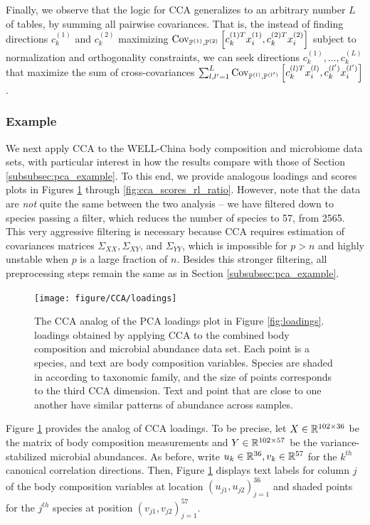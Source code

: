\documentclass[14pt]{extarticle}
\begin{document}
Finally, we observe that the logic for CCA generalizes to an arbitrary number
$L$ of tables, by summing all pairwise covariances. That is, the instead of
finding directions $c_{k}^{(1)}$ and $c_{k}^{(2)}$ maximizing
$\mathrm{Cov}_{\mathbb{P}^{(1)}, \mathbb{P}^{(2)}}\left[{c_{k}^{(1)T}x_{i}^{(1)},
  c_{k}^{(2)T}x_{i}^{(2)}}\right]$ subject to normalization and orthogonality
constraints, we can seek directions $c_{k}^{(1)}, \dots, c_{k}^{(L)}$ that
maximize the sum of cross-covariances $\sum_{l,l^{\prime} = 1}^{L}
\mathrm{Cov}_{\mathbb{P}^{(l)}, \mathbb{P}^{(l^{\prime})}}\left[{c_{k}^{(l) T}x_{i}^{(l)},
  c_{k}^{(l^{\prime})}x_{i}^{(l^{\prime})}}\right]$.

\subsubsection{Example}
\label{subsubsec:cca_example}

We next apply CCA to the WELL-China body composition and microbiome data sets,
with particular interest in how the results compare with those of Section
\ref{subsubsec:pca_example}. To this end, we provide analogous loadings and
scores plots in Figures \ref{fig:cca_loadings} through
\ref{fig:cca_scores_rl_ratio}. However, note that the data are \textit{not}
quite the same between the two analysis -- we have filtered down to species passing
a filter, which reduces the number of species to 57, from 2565. This very
aggressive filtering is necessary because CCA requires estimation of covariances
matrices $\Sigma_{XX}, \Sigma_{XY}$, and $\Sigma_{YY}$, which is impossible for
$p > n$ and highly unstable when $p$ is a large fraction of $n$. Besides this
stronger filtering, all preprocessing steps remain the same as in Section
\ref{subsubsec:pca_example}.

\begin{figure}
  \centering
  \texttt{[image: figure/CCA/loadings]}
  \caption{The CCA analog of the PCA loadings plot in Figure \ref{fig:loadings}.
      loadings obtained by applying CCA to the combined body
      composition and microbial abundance data set. Each point is a species, and
      text are body composition variables. Species are shaded in according to
      taxonomic family, and the size of points corresponds to the third CCA
      dimension. Text and point that are close to one another have similar
      patterns of abundance across samples. 
      \label{fig:cca_loadings} }
\end{figure}

Figure \ref{fig:cca_loadings} provides the analog of CCA loadings. To be
precise, let $X \in \mathbb{R}^{102\times 36}$ be the matrix of body composition
measurements and $Y \in \mathbb{R}^{102 \times 57}$ be the variance-stabilized
microbial abundances. As before, write $u_{k} \in \mathbb{R}^{36}, v_{k} \in
\mathbb{R}^{57}$ for the $k^{th}$ canonical correlation directions. Then, Figure
\ref{fig:cca_loadings} displays text labels for column $j$ of the body
composition variables at location $\left(u_{j1}, u_{j2}\right)_{j = 1}^{36}$ and
shaded points for the $j^{th}$ species at position $\left(v_{j1},
v_{j2}\right)_{j = 1}^{57}$.
\end{document}
